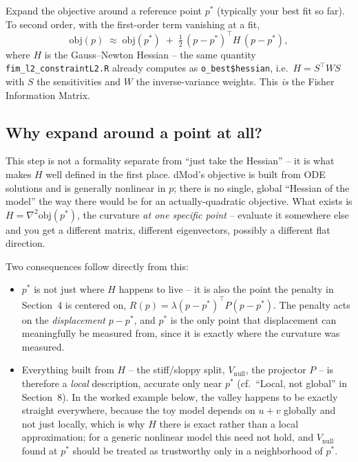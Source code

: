 \documentclass[11pt]{article}
\newcommand{\code}[1]{\texttt{#1}}
\newcommand{\file}[1]{\textcolor{black!60}{\texttt{#1}}}
\begin{document}
Expand the objective around a reference point $p^*$ (typically your best fit
so far). To second order, with the first-order term vanishing at a fit,
\begin{equation}
  \mathrm{obj}(p) \;\approx\; \mathrm{obj}(p^*) \;+\; \tfrac{1}{2}\,(p-p^*)^\top H\,(p-p^*),
\end{equation}
where $H$ is the Gauss--Newton Hessian -- the same quantity
\file{fim\_l2\_constraintL2.R} already computes as \code{o\_best\$hessian},
i.e.\ $H = S^\top W S$ with $S$ the sensitivities and $W$ the inverse-variance
weights. This \emph{is} the Fisher Information Matrix.

\subsection*{Why expand around a point at all?}

This step is not a formality separate from ``just take the Hessian'' -- it is what makes
$H$ well defined in the first place. dMod's objective is built from ODE solutions and is
generally nonlinear in $p$; there is no single, global ``Hessian of the model'' the way
there would be for an actually-quadratic objective. What exists is $H = \nabla^2
\mathrm{obj}(p^*)$, the curvature \emph{at one specific point} -- evaluate it somewhere
else and you get a different matrix, different eigenvectors, possibly a different flat
direction.

Two consequences follow directly from this:
\begin{itemize}
  \item $p^*$ is not just where $H$ happens to live -- it is also the point the penalty
  in Section~4 is centered on, $R(p) = \lambda(p-p^*)^\top P(p-p^*)$. The penalty acts on
  the \emph{displacement} $p-p^*$, and $p^*$ is the only point that displacement can
  meaningfully be measured from, since it is exactly where the curvature was measured.
  \item Everything built from $H$ -- the stiff/sloppy split, $V_{\mathrm{null}}$, the
  projector $P$ -- is therefore a \emph{local} description, accurate only near $p^*$
  (cf.\ ``Local, not global'' in Section~8). In the worked example below, the valley
  happens to be exactly straight everywhere, because the toy model depends on $u+v$
  globally and not just locally, which is why $H$ there is exact rather than a local
  approximation; for a generic nonlinear model this need not hold, and
  $V_{\mathrm{null}}$ found at $p^*$ should be treated as trustworthy only in a
  neighborhood of $p^*$.
\end{itemize}
\end{document}
